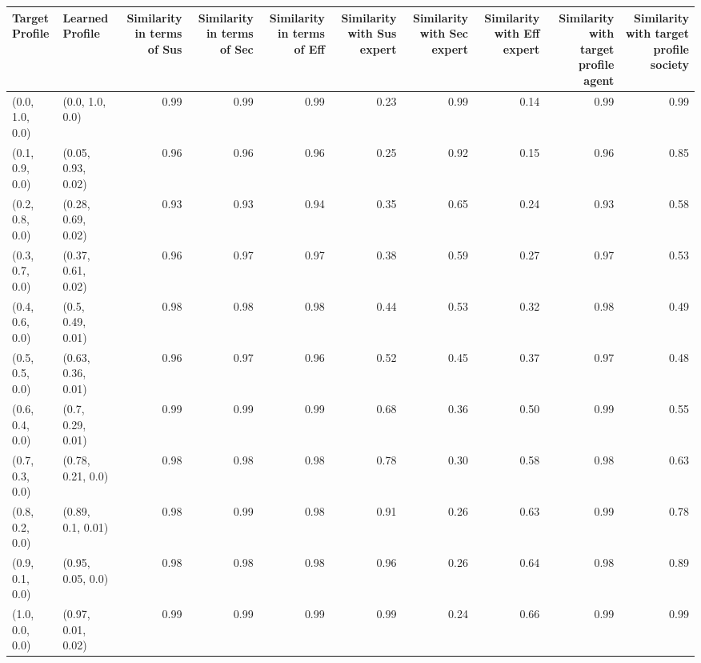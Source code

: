 \begin{tabular}{llrrrrrrrr}
\toprule
Target Profile & Learned Profile & Similarity in terms of Sus & Similarity in terms of Sec & Similarity in terms of Eff & Similarity with Sus expert & Similarity with Sec expert & Similarity with Eff expert & Similarity with target profile agent & Similarity with target profile society \\
\midrule
(0.0, 1.0, 0.0) & (0.0, 1.0, 0.0) & 0.99 & 0.99 & 0.99 & 0.23 & 0.99 & 0.14 & 0.99 & 0.99 \\
(0.1, 0.9, 0.0) & (0.05, 0.93, 0.02) & 0.96 & 0.96 & 0.96 & 0.25 & 0.92 & 0.15 & 0.96 & 0.85 \\
(0.2, 0.8, 0.0) & (0.28, 0.69, 0.02) & 0.93 & 0.93 & 0.94 & 0.35 & 0.65 & 0.24 & 0.93 & 0.58 \\
(0.3, 0.7, 0.0) & (0.37, 0.61, 0.02) & 0.96 & 0.97 & 0.97 & 0.38 & 0.59 & 0.27 & 0.97 & 0.53 \\
(0.4, 0.6, 0.0) & (0.5, 0.49, 0.01) & 0.98 & 0.98 & 0.98 & 0.44 & 0.53 & 0.32 & 0.98 & 0.49 \\
(0.5, 0.5, 0.0) & (0.63, 0.36, 0.01) & 0.96 & 0.97 & 0.96 & 0.52 & 0.45 & 0.37 & 0.97 & 0.48 \\
(0.6, 0.4, 0.0) & (0.7, 0.29, 0.01) & 0.99 & 0.99 & 0.99 & 0.68 & 0.36 & 0.50 & 0.99 & 0.55 \\
(0.7, 0.3, 0.0) & (0.78, 0.21, 0.0) & 0.98 & 0.98 & 0.98 & 0.78 & 0.30 & 0.58 & 0.98 & 0.63 \\
(0.8, 0.2, 0.0) & (0.89, 0.1, 0.01) & 0.98 & 0.99 & 0.98 & 0.91 & 0.26 & 0.63 & 0.99 & 0.78 \\
(0.9, 0.1, 0.0) & (0.95, 0.05, 0.0) & 0.98 & 0.98 & 0.98 & 0.96 & 0.26 & 0.64 & 0.98 & 0.89 \\
(1.0, 0.0, 0.0) & (0.97, 0.01, 0.02) & 0.99 & 0.99 & 0.99 & 0.99 & 0.24 & 0.66 & 0.99 & 0.99 \\
\bottomrule
\end{tabular}
